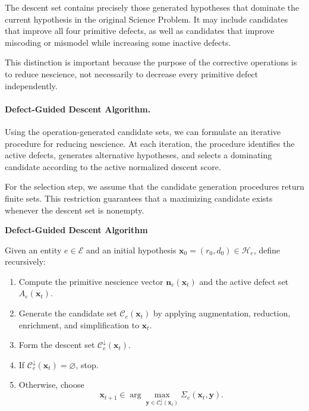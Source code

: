 The descent set contains precisely those generated
hypotheses that dominate the current hypothesis in
the original Science Problem. It may include candidates
that improve all four primitive defects, as well as
candidates that improve miscoding or mismodel while
increasing some inactive defects.

This distinction is important because the purpose
of the corrective operations is to reduce nescience,
not necessarily to decrease every primitive defect
independently.

\paragraph{Defect-Guided Descent Algorithm.}

Using the operation-generated candidate sets, we can
formulate an iterative procedure for reducing nescience.
At each iteration, the procedure identifies the active
defects, generates alternative hypotheses, and selects
a dominating candidate according to the active
normalized descent score.

For the selection step, we assume that the candidate
generation procedures return finite sets. This
restriction guarantees that a maximizing candidate
exists whenever the descent set is nonempty.

\begin{tBox}
\textbf{Defect-Guided Descent Algorithm}

Given an entity $e\in\mathcal E$ and an initial
hypothesis $\mathbf{x}_0=(r_0,d_0)\in\mathcal H_e$,
define recursively:

\begin{enumerate}
\item Compute the primitive nescience vector
$\mathbf n_e(\mathbf{x}_t)$ and the active defect set
$A_e(\mathbf{x}_t)$.

\item Generate the candidate set
$\mathcal C_e(\mathbf{x}_t)$ by applying augmentation,
reduction, enrichment, and simplification to
$\mathbf{x}_t$.

\item Form the descent set
$\mathcal C_e^\downarrow(\mathbf{x}_t)$.

\item If
$\mathcal C_e^\downarrow(\mathbf{x}_t)=\varnothing$,
stop.

\item Otherwise, choose
\[
\mathbf{x}_{t+1}
\in
\arg\max_{
\mathbf{y}\in\mathcal C_e^\downarrow(\mathbf{x}_t)
}
\Sigma_e(\mathbf{x}_t,\mathbf{y}).
\]
\end{enumerate}
\end{tBox}

